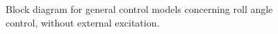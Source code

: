 \begin{figure}[ht]
\begin{tikzpicture}[scale=1, auto, >=stealth']
%

    \end{tikzpicture}
\caption{Block diagram for general control models concerning roll angle control, without external excitation.}

\label{fig:hessblock}

\end{figure}